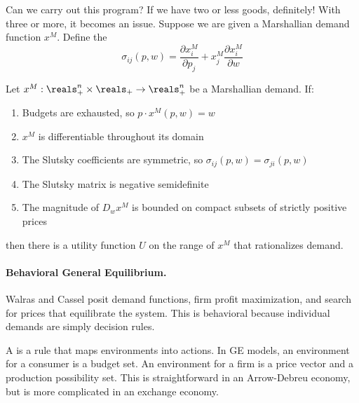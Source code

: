 \documentclass[10pt]{article}
\begin{document}
Can we carry out this program? If we have two or less goods, definitely! With three or more, it becomes an issue. Suppose we are given a Marshallian demand function $x^M$. Define the  \[\sigma_{ij}(p,w) = \frac{\partial x_i^M}{\partial p_j} + x^M_j \frac{\partial x_i^M}{\partial w}\]

\begin{theorem}
	Let $x^M : \reals^n_+ \times \reals_+ \to \reals^n_+$ be a Marshallian demand. If:
	\begin{enumerate}
		\item Budgets are exhausted, so $p \cdot x^M(p,w) = w$
		\item $x^M$ is differentiable throughout its domain
		\item The Slutsky coefficients are symmetric, so $\sigma_{ij} (p,w) = \sigma_{ji}(p,w)$
		\item The Slutsky matrix is negative semidefinite
		\item The magnitude of $D_wx^M$ is bounded on compact subsets of strictly positive prices
	\end{enumerate}
	then there is a utility function $U$ on the range of $x^M$ that rationalizes demand.
\end{theorem}

\paragraph{Behavioral General Equilibrium.}

Walras and Cassel posit demand functions, firm profit maximization, and search for prices that equilibrate the system. This is behavioral because individual demands are simply decision rules.

\begin{definition}
	A  is a rule that maps environments into actions. In GE models, an environment for a consumer is a budget set. An environment for a firm is a price vector and a production possibility set. This is straightforward in an Arrow-Debreu economy, but is more complicated in an exchange economy.
\end{definition}
\end{document}
